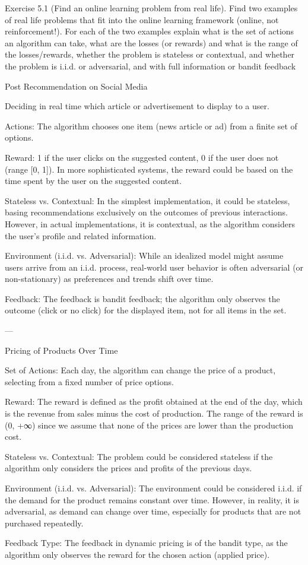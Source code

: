 Exercise 5.1 (Find an online learning problem from real life). Find two examples of real life problems
that fit into the online learning framework (online, not reinforcement!). For each of the two examples
explain what is the set of actions an algorithm can take, what are the losses (or rewards) and what is the
range of the losses/rewards, whether the problem is stateless or contextual, and whether the problem is
i.i.d. or adversarial, and with full information or bandit feedback

Post Recommendation on Social Media

Deciding in real time which article or advertisement to display to a user.

Actions:
The algorithm chooses one item (news article or ad) from a finite set of options.

Reward:
1 if the user clicks on the suggested content, 0 if the user does not (range [0, 1]).
In more sophisticated systems, the reward could be based on the time spent by the user on the suggested content.

Stateless vs. Contextual:
In the simplest implementation, it could be stateless, basing recommendations exclusively on the outcomes of previous interactions.
However, in actual implementations, it is contextual, as the algorithm considers the user's profile and related information.

Environment (i.i.d. vs. Adversarial):
While an idealized model might assume users arrive from an i.i.d. process, real-world user behavior is often adversarial (or non-stationary) as preferences and trends shift over time.

Feedback:
The feedback is bandit feedback; the algorithm only observes the outcome (click or no click) for the displayed item, not for all items in the set.

---

Pricing of Products Over Time

Set of Actions:
Each day, the algorithm can change the price of a product, selecting from a fixed number of price options.

Reward:
The reward is defined as the profit obtained at the end of the day, which is the revenue from sales minus the cost of production.
The range of the reward is (0, +∞) since we assume that none of the prices are lower than the production cost.

Stateless vs. Contextual:
The problem could be considered stateless if the algorithm only considers the prices and profits of the previous days.

Environment (i.i.d. vs. Adversarial):
The environment could be considered i.i.d. if the demand for the product remains constant over time.
However, in reality, it is adversarial, as demand can change over time, especially for products that are not purchased repeatedly.

Feedback Type:
The feedback in dynamic pricing is of the bandit type, as the algorithm only observes the reward for the chosen action (applied price).